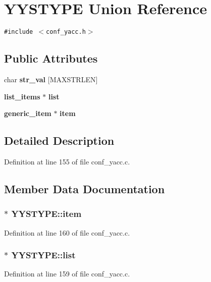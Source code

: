 \section{YYSTYPE Union Reference}
\label{unionYYSTYPE}
{\tt \#include $<$conf\_\-yacc.h$>$}

\subsection*{Public Attributes}
\begin{CompactItemize}
\item 
char {\bf str\_\-val} [MAXSTRLEN]
\item 
{\bf list\_\-items} $\ast$ {\bf list}
\item 
{\bf generic\_\-item} $\ast$ {\bf item}
\end{CompactItemize}


\subsection{Detailed Description}


Definition at line 155 of file conf\_\-yacc.c.

\subsection{Member Data Documentation}
\subsubsection[{item}]{ $\ast$ {\bf YYSTYPE::item}}\label{unionYYSTYPE_e308b03740722be501b9d4df53df15df}




Definition at line 160 of file conf\_\-yacc.c.
\subsubsection[{list}]{ $\ast$ {\bf YYSTYPE::list}}\label{unionYYSTYPE_1ad09a5d61f1c94d432b5280b317e32b}




Definition at line 159 of file conf\_\-yacc.c.
